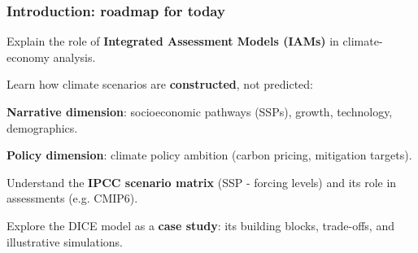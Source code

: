 \documentclass[xcolor=x11names,compress,aspectratio=169]{beamer}%
\makeatletter
\renewenvironment{itemize}{\begin{compactitemize}[<+-| alert@+>]}{\end{compactitemize}}
\makeatother
\begin{document}
\begin{frame}%
%

\frametitle{Introduction: roadmap for today}%


\begin{itemize}
\item Explain the role of \textbf{Integrated Assessment Models (IAMs)} in
climate-economy analysis. \vspace{0.5em}

\item Learn how climate scenarios are \textbf{constructed}, not predicted:

\begin{itemize}
\item \textbf{Narrative dimension}: socioeconomic pathways (SSPs), growth,
technology, demographics.

\item \textbf{Policy dimension}: climate policy ambition (carbon pricing,
mitigation targets).
\end{itemize}

\vspace{0.5em}

\item Understand the \textbf{IPCC scenario matrix} (SSP - forcing levels) and
its role in assessments (e.g. CMIP6). \vspace{0.5em}

\item Explore the DICE model as a \textbf{case study}: its building blocks,
trade-offs, and illustrative simulations.
\end{itemize}

%

\transboxout
\end{frame}%
%
\end{document}
